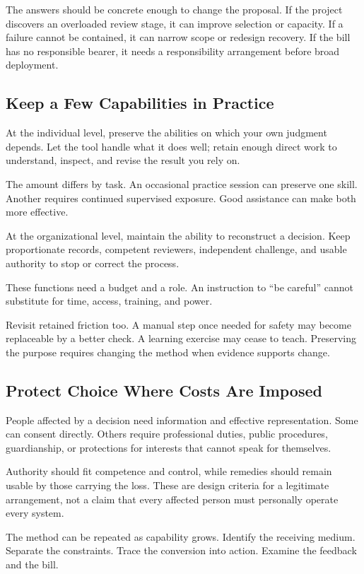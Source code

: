 \documentclass[11pt,openany]{book}
\begin{document}
The answers should be concrete enough to change the proposal. If the project discovers an overloaded review stage, it can improve selection or capacity. If a failure cannot be contained, it can narrow scope or redesign recovery. If the bill has no responsible bearer, it needs a responsibility arrangement before broad deployment.

\subsection{Keep a Few Capabilities in Practice}

At the individual level, preserve the abilities on which your own judgment depends. Let the tool handle what it does well; retain enough direct work to understand, inspect, and revise the result you rely on.

The amount differs by task. An occasional practice session can preserve one skill. Another requires continued supervised exposure. Good assistance can make both more effective.

At the organizational level, maintain the ability to reconstruct a decision. Keep proportionate records, competent reviewers, independent challenge, and usable authority to stop or correct the process.

These functions need a budget and a role. An instruction to “be careful” cannot substitute for time, access, training, and power.

Revisit retained friction too. A manual step once needed for safety may become replaceable by a better check. A learning exercise may cease to teach. Preserving the purpose requires changing the method when evidence supports change.

\subsection{Protect Choice Where Costs Are Imposed}

People affected by a decision need information and effective representation. Some can consent directly. Others require professional duties, public procedures, guardianship, or protections for interests that cannot speak for themselves.

Authority should fit competence and control, while remedies should remain usable by those carrying the loss. These are design criteria for a legitimate arrangement, not a claim that every affected person must personally operate every system.

The method can be repeated as capability grows. Identify the receiving medium. Separate the constraints. Trace the conversion into action. Examine the feedback and the bill.
\end{document}
